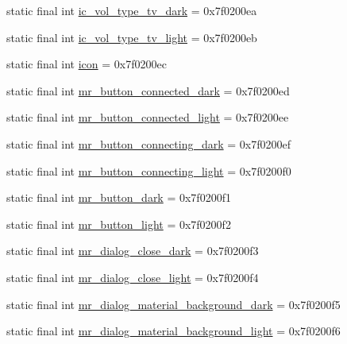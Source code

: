 \begin{CompactItemize}
\item 
static final int \hyperlink{classandroid_1_1support_1_1v7_1_1palette_1_1_r_1_1drawable_2ca6d68fc8ac74efdd47d21f358806ae}{ic\_\-vol\_\-type\_\-tv\_\-dark} = 0x7f0200ea
\item 
static final int \hyperlink{classandroid_1_1support_1_1v7_1_1palette_1_1_r_1_1drawable_b7960359f8b01b9a8f3c0807a7f26c4c}{ic\_\-vol\_\-type\_\-tv\_\-light} = 0x7f0200eb
\item 
static final int \hyperlink{classandroid_1_1support_1_1v7_1_1palette_1_1_r_1_1drawable_890458ca42f2f744b6dbf29ebc882c73}{icon} = 0x7f0200ec
\item 
static final int \hyperlink{classandroid_1_1support_1_1v7_1_1palette_1_1_r_1_1drawable_00cded799af201976188bba8c1bc1765}{mr\_\-button\_\-connected\_\-dark} = 0x7f0200ed
\item 
static final int \hyperlink{classandroid_1_1support_1_1v7_1_1palette_1_1_r_1_1drawable_e7dc655c3e1d3de8f872b28a5e97e0cb}{mr\_\-button\_\-connected\_\-light} = 0x7f0200ee
\item 
static final int \hyperlink{classandroid_1_1support_1_1v7_1_1palette_1_1_r_1_1drawable_1c00d788ed46c1f5c0ef50a6fa1ad2d8}{mr\_\-button\_\-connecting\_\-dark} = 0x7f0200ef
\item 
static final int \hyperlink{classandroid_1_1support_1_1v7_1_1palette_1_1_r_1_1drawable_65b293e56a9255dd6e8fe440463b517f}{mr\_\-button\_\-connecting\_\-light} = 0x7f0200f0
\item 
static final int \hyperlink{classandroid_1_1support_1_1v7_1_1palette_1_1_r_1_1drawable_38dc1552dabdd16cf2dffbafead40e19}{mr\_\-button\_\-dark} = 0x7f0200f1
\item 
static final int \hyperlink{classandroid_1_1support_1_1v7_1_1palette_1_1_r_1_1drawable_7ae3b027724f30435cc28b7b158f3a22}{mr\_\-button\_\-light} = 0x7f0200f2
\item 
static final int \hyperlink{classandroid_1_1support_1_1v7_1_1palette_1_1_r_1_1drawable_900e71ed053c9d69b6ccf1995c374c91}{mr\_\-dialog\_\-close\_\-dark} = 0x7f0200f3
\item 
static final int \hyperlink{classandroid_1_1support_1_1v7_1_1palette_1_1_r_1_1drawable_d83ad5f4ddeb27dcf410f48127ddc575}{mr\_\-dialog\_\-close\_\-light} = 0x7f0200f4
\item 
static final int \hyperlink{classandroid_1_1support_1_1v7_1_1palette_1_1_r_1_1drawable_05a644df7389780f580f47b238d1fc80}{mr\_\-dialog\_\-material\_\-background\_\-dark} = 0x7f0200f5
\item 
static final int \hyperlink{classandroid_1_1support_1_1v7_1_1palette_1_1_r_1_1drawable_cebde40b14ff4240e988841b9faa1cba}{mr\_\-dialog\_\-material\_\-background\_\-light} = 0x7f0200f6

\end{CompactItemize}
